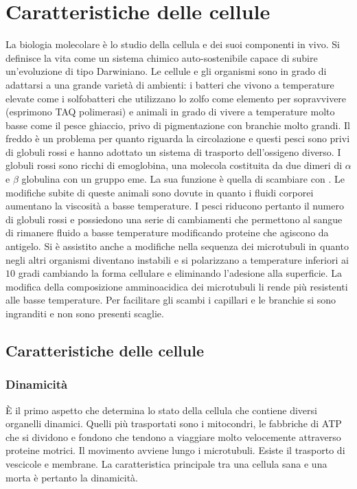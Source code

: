 \section{Caratteristiche delle cellule}
La biologia molecolare \`e lo studio della cellula e dei suoi componenti in vivo. Si definisce la vita come un sistema chimico auto-sostenibile capace di subire un'evoluzione di tipo 
Darwiniano. Le cellule e gli organismi sono in grado di adattarsi a una grande variet\`a di ambienti: i batteri che vivono a temperature elevate come i solfobatteri che utilizzano lo 
zolfo come elemento per sopravvivere (esprimono TAQ polimerasi) e animali in grado di vivere a temperature molto basse come il pesce ghiaccio, privo di pigmentazione con branchie molto
grandi. Il freddo \`e un problema per quanto riguarda la circolazione e questi pesci sono privi di globuli rossi e hanno adottato un sistema di trasporto dell'ossigeno diverso. I globuli
rossi sono ricchi di emoglobina, una molecola costituita da due dimeri di $\alpha$ e $\beta$ globulina con un gruppo eme. La sua funzione \`e quella di scambiare \textbf{} con 
\textbf{}. Le modifiche subite di queste animali sono dovute in quanto i fluidi corporei aumentano la viscosit\`a a basse temperature. I pesci riducono pertanto il numero di 
globuli rossi e possiedono una serie di cambiamenti che permettono al sangue di rimanere fluido a basse temperature modificando proteine che agiscono da antigelo. Si \`e assistito anche 
a modifiche nella sequenza dei microtubuli in quanto negli altri organismi diventano instabili e si polarizzano a temperature inferiori ai $10$ gradi cambiando la forma cellulare e 
eliminando l'adesione alla superficie. La modifica della composizione amminoacidica dei microtubuli li rende pi\`u resistenti alle basse temperature. Per facilitare gli scambi i capillari
e le branchie si sono ingranditi e non sono presenti scaglie. 
\subsection{Caratteristiche delle cellule}
\subsubsection{Dinamicit\`a}
\`E il primo aspetto che determina lo stato della cellula che contiene diversi organelli dinamici. Quelli pi\`u trasportati sono i mitocondri, le fabbriche di ATP che si dividono e 
fondono che tendono a viaggiare molto velocemente attraverso proteine motrici. Il movimento avviene lungo i microtubuli. Esiste il trasporto di vescicole e membrane. La caratteristica
principale tra una cellula sana e una morta \`e pertanto la dinamicit\`a. 
